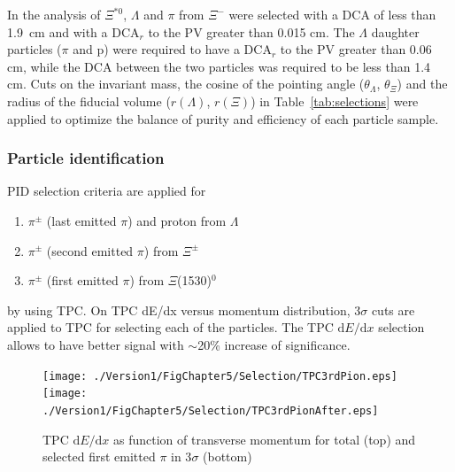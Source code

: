 In the analysis of $\Xi^{*0}$, $\Lambda$ and $\pi$ from $\Xi^{-}$ were 
selected with a DCA of less than 1.9~cm and with a DCA$_r$ to the PV greater than 0.015 cm. 
The $\Lambda$ daughter particles ($\pi$ and p) were required to have a DCA$_r$ to the PV greater 
than 0.06 cm, while the DCA between the two particles was required to be less than 1.4 cm. Cuts on 
the invariant mass, the cosine of the pointing angle ($\theta_\Lambda$, $\theta_\Xi$) and the radius of 
the fiducial volume ($r(\Lambda)$, $r(\Xi)$) in Table~\ref{tab:selections} were applied to optimize 
the balance of purity and efficiency of each particle sample. 


\newpage
\subsubsection{Particle identification}\label{sec:pPb:PID}
PID selection criteria are applied for
 
 \begin{enumerate}
\item $\pi^{\pm}$ (last emitted $\pi$) and proton from $\Lambda$
\item $\pi^{\pm}$ (second emitted $\pi$)   from $\Xi^{\pm}$
\item $\pi^{\pm}$ (first emitted $\pi$) from  $\Xi$(1530)$^{0}$
\end{enumerate}
 by using TPC. On TPC dE/dx versus momentum distribution, 3$\sigma$ cuts are applied to TPC for selecting each of the particles. The TPC $\mathrm{d}E/\mathrm{d}x$ selection allows to have better signal with $\sim$20\% increase of significance. 
  
 
\begin{figure}[htbp]
\begin{center}
\texttt{[image: ./Version1/FigChapter5/Selection/TPC3rdPion.eps]}
\hspace{0.5cm}
\texttt{[image: ./Version1/FigChapter5/Selection/TPC3rdPionAfter.eps]}
\label{fig:TPCpionFirstEmitted} 
\caption{ TPC $\mathrm{d}E/\mathrm{d}x$ as function of transverse momentum for total (top) and selected first emitted $\pi$ in 3$\sigma$ (bottom) }
\end{center}
\end{figure}

